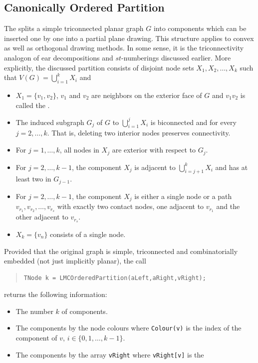 \documentclass[a4paper,11pt,twoside]{book}
\begin{document}
\begin{multicols}{2}
\subsection{Canonically Ordered Partition}
The  splits a simple triconnected planar
graph $G$ into components which can be inserted one by one into a partial plane
drawing. This structure applies to convex as well as orthogonal drawing methods.
In some sense, it is the triconnectivity analogon of ear decompositions and
$st$-numberings discussed earlier. More explicitly, the discussed partition
consists of disjoint node sets $X_1,X_2,\dots,X_k$ such that
$V(G)=\bigcup_{i=1}^k X_i$ and
\begin{itemize}
\item $X_1 = \{v_1,v_2\}$, $v_1$ and $v_2$ are neighbors on the exterior
    face of $G$ and $v_1 v_2$ is called the .
\item The induced subgraph $G_j$ of $G$ to $\bigcup_{i=1}^j X_i$ is biconnected
    and  for every $j=2,\dots,k$. That is, deleting
    two interior nodes preserves connectivity.
\item For $j=1,\dots,k$, all nodes in $X_j$ are exterior with respect to $G_j$.
\item For $j=2,\dots,k-1$, the component $X_j$ is adjacent to
    $\bigcup_{i=j+1}^k X_i$ and has at least two  in $G_{j-1}$.
\item For $j=2,\dots,k-1$, the component $X_j$ is either a single node or a path
    $v_{r_1},v_{r_2},\dots,v_{r_s}$ with exactly two contact nodes, one adjacent
    to $v_{r_1}$ and the other adjacent to $v_{r_s}$.
\item $X_k = \{v_n\}$ consists of a single node.
\end{itemize}
Provided that the original graph is simple, triconnected and combinatorially
embedded (not just implicitly planar), the call
\begin{quote}
\begin{verbatim}
TNode k = LMCOrderedPartition(aLeft,aRight,vRight);
\end{verbatim}
\end{quote}
returns the following information:
\begin{itemize}
\item The number $k$ of components.
\item The components by the node colours where \verb/Colour(v)/ is the index of
    the component of $v$, $i\in\{0,1,\dots,k-1\}$.
\item The components by the array \verb/vRight/ where \verb/vRight[v]/ is the

\end{itemize}
\end{multicols}
\end{document}
